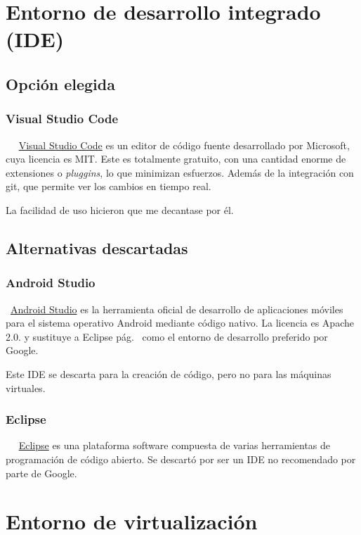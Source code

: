\section{Entorno de desarrollo integrado (IDE)}

\subsection{Opción elegida}

\subsubsection{Visual Studio Code}~\label{visual}
~\href{https://code.visualstudio.com/}{Visual Studio Code} es un editor de código fuente desarrollado por Microsoft, cuya licencia es MIT. Este es totalmente gratuito, con una cantidad enorme de extensiones o \emph{pluggins}, lo que minimizan esfuerzos. Además de la integración con git, que permite ver los cambios en tiempo real. 

La facilidad de uso hicieron que me decantase por él.

\subsection{Alternativas descartadas}

\subsubsection{Android Studio}\label{androidstudio}
~\href{https://developer.android.com/studio}{Android Studio} es la herramienta oficial de desarrollo de aplicaciones móviles para el sistema operativo Android mediante código nativo. La licencia es Apache 2.0. y sustituye a Eclipse pág.~\pageref{eclipse} como el entorno de desarrollo preferido por Google.

Este IDE se descarta para la creación de código, pero no para las máquinas virtuales.

\subsubsection{Eclipse}~\label{eclipse}
~\href{https://www.eclipse.org/}{Eclipse} es una plataforma software compuesta de varias herramientas de programación de código abierto. Se descartó por ser un IDE no recomendado por parte de Google.

\section{Entorno de virtualización}

